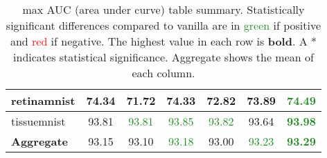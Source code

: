 \documentclass{article}
\begin{document}
\begin{table}[h]
{\begin{tabular}{l|cccccc}
            retinamnist & 74.34 & 71.72 & 74.33 & 72.82 & 73.89 & \textbf{\textcolor{ForestGreen}{74.49}} \\ \hline
            tissuemnist & 93.81 & \textcolor{ForestGreen}{93.81} & \textcolor{ForestGreen}{93.85} & \textcolor{ForestGreen}{93.82} & 93.64 & \textbf{\textcolor{ForestGreen}{93.98}} \\ \hline
            \textbf{Aggregate} & 93.15 & 93.10 & \textcolor{ForestGreen}{93.18} & 93.00 & \textcolor{ForestGreen}{93.23} & \textbf{\textcolor{ForestGreen}{93.29}} \\ \hline
        \end{tabular}
    }
    \caption{max AUC (area under curve) table summary. Statistically significant differences compared to vanilla are in \textcolor{ForestGreen}{green} if positive and \textcolor{red}{red} if negative. The highest value in each row is \textbf{bold}. A * indicates statistical significance. Aggregate shows the mean of each column.}
    \label{tab:results4}
\end{table}
\end{document}
